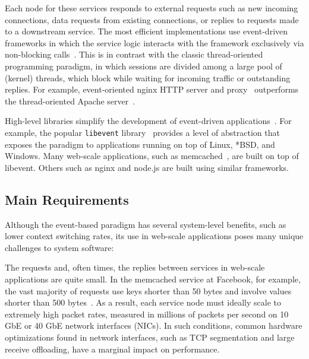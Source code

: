 Each node for these services responds to external requests such as new
incoming connections, data requests from existing connections, or
replies to requests made to a downstream service.  The most efficient
implementations use event-driven frameworks in which the service
logic interacts with the framework exclusively via non-blocking
calls~\cite{DBLP:conf/usenix/PaiDZ99,missing,missing}. This is in contrast with the classic thread-oriented
programming paradigm, in which sessions are divided among a large pool
of (kernel) threads, which block while waiting for incoming traffic or
outstanding replies. For example, event-oriented nginx HTTP server
and proxy~\cite{reese2008nginx} outperforms the thread-oriented Apache
server~\cite{misc:apache}.

High-level libraries simplify the development of event-driven
applications~\cite{provos2003libevent,libev,libuv}.  For example, the
popular \texttt{libevent} library~\cite{provos2003libevent} provides a
level of abstraction that exposes the paradigm to applications running
on top of Linux, *BSD, and Windows.  Many web-scale applications, such
as memcached~\cite{missing}, are built on top of libevent.  Others
such as nginx and node.js are built using similar frameworks.


\subsection{Main Requirements}
\label{sec:motivation:challenges}

Although the event-based paradigm has several system-level benefits,
such as lower context switching rates, its use in web-scale
applications poses many unique challenges to system software:

 The requests and, often times, the replies
between services in web-scale applications are quite small. In the
memcached service at Facebook, for example, the vast majority of
requests use keys shorter than 50 bytes and involve values shorter
than 500 bytes~\cite{Atikoglu:2012:WAL}. As a result, each service
node must ideally scale to extremely high packet rates, measured in
millions of packets per second on 10 GbE or 40 GbE network interfaces (NICs).
In such conditions, common hardware optimizations found in network
interfaces, such as TCP segmentation and large receive offloading,
have a marginal impact on performance. 


